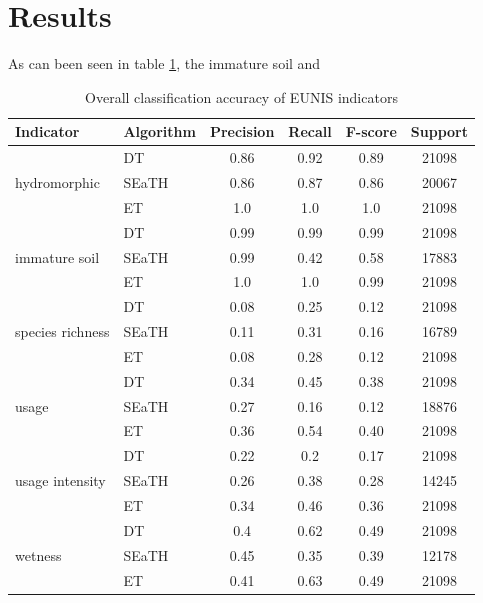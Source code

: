 \documentclass[authoryear,preprint,12pt,number]{elsarticle}
\begin{document}
\section{Results}
As can been seen in table \ref{tab:accuracy_indicators}, the immature soil and
\begin{table}
    \centering
    \begin{tabular}{l l c c c c}
    Indicator & Algorithm & Precision & Recall & F-score & 
    Support\\
    \hline
    \multirow{3}{*}{hydromorphic}
    & DT & 0.86 & 0.92 & 0.89 & 21098\\
    & SEaTH & 0.86 & 0.87 & 0.86 & 20067\\
    & ET & 1.0 & 1.0 & 1.0 & 21098\\
    \cline{2-6}
    \multirow{3}{*}{immature soil}
    & DT & 0.99 & 0.99 & 0.99 & 21098\\
    & SEaTH & 0.99 & 0.42 & 0.58 & 17883\\
    & ET & 1.0 & 1.0 & 0.99 & 21098\\
    \cline{2-6}
    \multirow{3}{*}{species richness}
    & DT & 0.08 & 0.25 & 0.12 & 21098\\
    & SEaTH & 0.11 & 0.31 & 0.16 & 16789\\
    & ET & 0.08 & 0.28 & 0.12 & 21098\\
    \cline{2-6}
    \multirow{3}{*}{usage}
    & DT & 0.34 & 0.45 & 0.38 & 21098\\
    & SEaTH & 0.27 & 0.16 & 0.12 & 18876\\
    & ET & 0.36 & 0.54 & 0.40 & 21098\\
    \cline{2-6}
    \multirow{3}{*}{usage intensity}
    & DT & 0.22 & 0.2 & 0.17 & 21098\\
    & SEaTH & 0.26 & 0.38 & 0.28 & 14245\\
    & ET & 0.34 & 0.46 & 0.36 & 21098\\
    \cline{2-6}
    \multirow{3}{*}{wetness}
    & DT & 0.4 & 0.62 & 0.49 & 21098\\
    & SEaTH & 0.45 & 0.35 & 0.39 & 12178\\
    & ET & 0.41 & 0.63 & 0.49 & 21098\\
    \end{tabular}
    \label{tab:classification_EUNIS}
    \caption{Overall classification accuracy of EUNIS indicators}
    \label{tab:accuracy_indicators}
\end{table}
\end{document}
